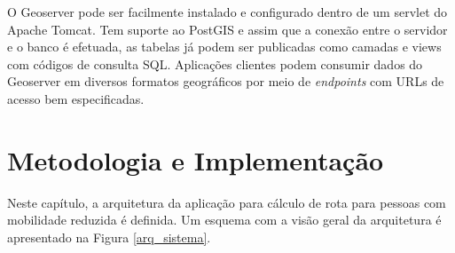 \documentclass[oneside,openright,12pt]{ufsm_2015} %
\begin{document}
O Geoserver pode ser facilmente instalado e configurado dentro de um servlet do Apache Tomcat. 
Tem suporte ao PostGIS e assim que a conexão entre o servidor e o banco é efetuada, as tabelas já podem ser publicadas como camadas e views com códigos de consulta SQL. 
Aplicações clientes podem consumir dados do Geoserver em diversos formatos geográficos por meio de \textit{endpoints} com URLs de acesso bem especificadas.










\chapter{Metodologia e Implementação}
\label{sec:metodologia}

Neste capítulo, a arquitetura da aplicação para cálculo de rota para pessoas com mobilidade reduzida é definida. 
Um esquema com a visão geral da arquitetura é apresentado na Figura \ref{arq_sistema}.
\end{document}
